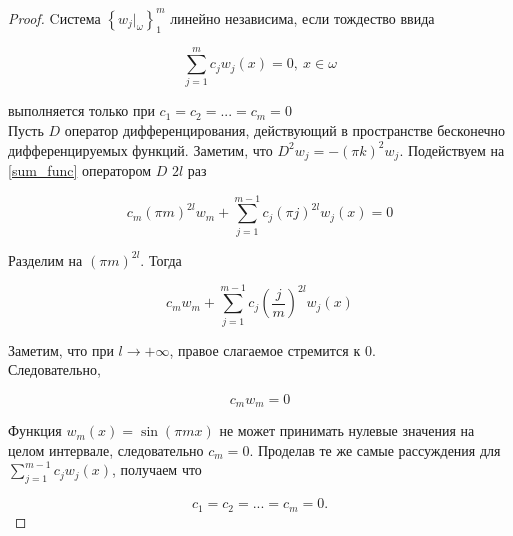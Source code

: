 \begin{proof}
    Cистема $\left\{ w_j|_{\omega} \right\}^m_1$ линейно независима, если 
    тождество ввида
    
    \begin{equation}\label{sum_func}
        \sum \limits_{j = 1}^m{c_j w_j(x)} = 0, \ x \in \omega
    \end{equation}

    выполняется только при $c_1 = c_2 = ... = c_m = 0$\\

    Пусть $D$ оператор дифференцирования, действующий в пространстве бесконечно 
    дифференцируемых функций.
    Заметим, что $D^2 w_j = -(\pi k)^2 w_j$. Подействуем  на \eqref{sum_func} 
    оператором $D$ $2l$ раз

    \begin{equation*}
        c_m (\pi m)^{2l} w_m + \sum \limits_{j = 1}^{m - 1}{c_j (\pi j)^{2l} w_j(x)} = 0
    \end{equation*}

    Разделим на $(\pi m)^{2l}$. Тогда

    \begin{equation*}
        c_m w_m + \sum \limits_{j = 1}^{m - 1}{c_j \left(\frac{j}{m}\right)^{2l} w_j(x)}
    \end{equation*}

    Заметим, что при $l \rightarrow +\infty$, правое слагаемое стремится к 0.\\
    Следовательно,

    \begin{equation*}
        c_m w_m = 0
    \end{equation*}

    Функция $w_m(x) = \sin{(\pi m x)}$ не может принимать нулевые значения на 
    целом интервале, следовательно $c_m = 0$. Проделав те же самые рассуждения 
    для $\sum \limits_{j = 1}^{m - 1}{c_j w_j(x)}$, получаем что

    \begin{equation*}
        c_1 = c_2 = ... = c_m = 0.
    \end{equation*}

\end{proof}

\par
\vspace{2ex}

